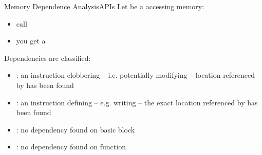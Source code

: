 \begin{frame}{Memory Dependence Analysis}{APIs}
Let  be a  accessing memory:

\begin{itemize}
\item call 
\item you get a 
\end{itemize}

\vfill
Dependencies are classified:

\begin{itemize}
\item {}: an instruction clobbering --
      i.e. potentially modifying -- location referenced by 
      has been found
\item {}: an instruction defining -- e.g.
      writing -- the exact location referenced by  has been
      found
\item {}: no dependency found on
       basic block
\item {}: no dependency found on
       function
\end{itemize}
\end{frame}